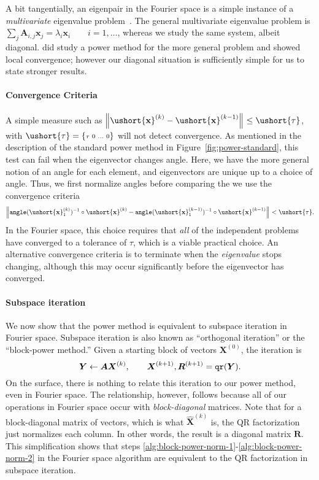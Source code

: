 \documentclass[1p,authoryear,letterpaper]{elsarticle}
\renewcommand{\cite}{\citep}
\providecommand{\normof}[2][]{\left\| #2 \right\|_{#1}}\providecommand{\nnormof}[2][]{\| #2 \|_{#1}}\providecommand{\itr}[2]{#1^{(#2)}}
\providecommand{\itn}[1]{^{(#1)}}\providecommand{\cardof}[1]{\left| #1 \right|}
\providecommand{\mat}{\boldsymbol}
\renewcommand{\vec}{\mathbf}
\providecommand{\mA}{\ensuremath{\mat{A}}}
\providecommand{\mR}{\ensuremath{\mat{R}}}
\providecommand{\mX}{\ensuremath{\mat{X}}}
\providecommand{\mY}{\ensuremath{\mat{Y}}}
\providecommand{\vx}{\ensuremath{\vec{x}}}
\newcommand{\cel}[1]{\ushort{#1}}
\newcommand{\csbmat}[1]{\left\{\! \begin{smallmatrix} #1
\end{smallmatrix} \! \right\}}
\newcommand{\celv}[1]{\cel{\vec{#1}}}
\newcommand{\cvx}{\ensuremath{\celv{x}}}
\newcommand{\mXhat}{\mat{\hat{X}}}
\DeclareMathOperator{\tangle}{\texttt{angle}}
\begin{document}
A bit tangentially, an eigenpair
in the Fourier space is a simple instance of
a \emph{multivariate} eigenvalue
problem~\cite{Chu1993-MEP}.
The general multivariate eigenvalue problem is
$\sum_{j} \mA_{i,j} \vx_j = \lambda_i \vx_i \qquad i=1,\ldots$,
whereas we study the same system, albeit diagonal.
\citet{Chu1993-MEP} did study a power method for the more
general problem and showed local convergence;
however our diagonal situation is sufficiently
simple for us to state stronger results.



\paragraph{Convergence Criteria}
A simple measure
such as $\normof{\cvx\itn{k}-\cvx\itn{k-1}} \le \cel{\tau}$,
with $\cel{\tau} = \csbmat{\tau & 0 & \ldots & 0}$ will not detect
convergence.  As mentioned in the description of the standard
power method in Figure~\ref{fig:power-standard}, this test
can fail when the eigenvector changes angle.  Here, we have
the more general notion of an angle for each element,
and eigenvectors are unique up to a choice of angle.  Thus,
we first normalize angles before comparing the
we use the convergence criteria 
\begin{equation} \label{eq:power-convergence}
 \normof{ \tangle(\cvx_1\itn{k})^{-1} \circ \cvx\itn{k}
     - \tangle(\cvx\itn{k-1}_1)^{-1} \circ \cvx\itn{k-1} } < \cel{\tau}.
\end{equation}
In the Fourier space, this choice requires that \emph{all}
of the independent problems have converged to a
tolerance of $\tau$, which is a viable practical choice.
An alternative convergence
criteria is to terminate when the \emph{eigenvalue}
stops changing, although this may occur significantly
before the eigenvector has converged.


\paragraph{Subspace iteration}
We now show that the power method is equivalent
to subspace iteration in Fourier space.  Subspace
iteration is also known as
``orthogonal iteration'' or the ``block-power method.''
Given a starting
block of vectors $\mX\itn{0}$, the iteration is
\[ \mY \leftarrow \mA \mX\itn{k}, \qquad
     \mX\itn{k+1}, \mR\itn{k+1} = \text{\texttt{qr}}(\mY).
\]
On the surface, there is nothing to relate this iteration to
our power method, even in Fourier space.  The relationship,
however, follows because all of our operations in
Fourier space occur with \emph{block-diagonal} matrices.
Note that for a block-diagonal matrix of vectors,
which is what $\mXhat\itn{k}$ is, the QR factorization
just normalizes each column.  In other words, the
result is a diagonal matrix $\mR$.  This simplification
shows that steps
\ref{alg:block-power-norm-1}-\ref{alg:block-power-norm-2}
in the Fourier space algorithm are equivalent to
the QR factorization in subspace iteration.
\end{document}
